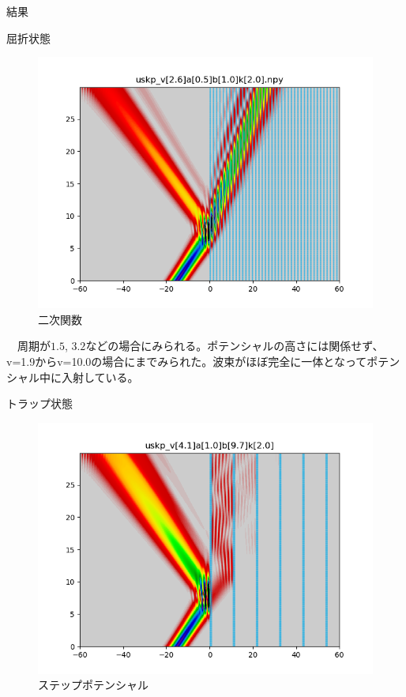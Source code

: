 \documentclass[a4paper, lualatex]{bxjsarticle}
\begin{document}
\begin{section}{結果}
\begin{subsection}{屈折状態}
\begin{figure}[h]
\begin{minipage}{0.5\hsize}
                \includegraphics[width=0.9\hsize]{kussetsu4.png}
                \caption{二次関数}
            \end{minipage}
        \end{figure}
   \par　周期が$1.5$, $3.2$などの場合にみられる。ポテンシャルの高さには関係せず、v=1.9からv=10.0の場合にまでみられた。波束がほぼ完全に一体となってポテンシャル中に入射している。
    \end{subsection}
\newpage
    \begin{subsection}{トラップ状態}
        \begin{figure}[h]
            \begin{minipage}{0.5\hsize}
                \centering
                \includegraphics[width=0.9\hsize]{trap1.png}
                \caption{ステップポテンシャル}
            \end{minipage}

\end{figure}
\end{subsection}
\end{section}
\end{document}
